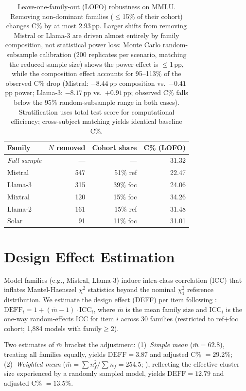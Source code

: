 \begin{table}[h]
\centering
\caption{Leave-one-family-out (LOFO) robustness on MMLU. Removing non-dominant families ($\leq$15\% of their cohort) changes C\% by at most 2.93\,pp. Larger shifts from removing Mistral or Llama-3 are driven almost entirely by family composition, not statistical power loss: Monte Carlo random-subsample calibration (200 replicates per scenario, matching the reduced sample size) shows the power effect is $\leq$1\,pp, while the composition effect accounts for 95--113\% of the observed C\% drop (Mistral: $-8.44$\,pp composition vs.\ $-0.41$\,pp power; Llama-3: $-8.17$\,pp vs.\ ${+}0.91$\,pp; observed C\% falls below the 95\% random-subsample range in both cases). Stratification uses total test score for computational efficiency; cross-subject matching yields identical baseline C\%.}
\label{tab:lofo}
\small
\begin{tabular}{lrrr}
\toprule
Family & $N$ removed & Cohort share & C\% (LOFO) \\
\midrule
\emph{Full sample} & --- & --- & 31.32 \\
Mistral & 547 & 51\% ref & 22.47 \\
Llama-3 & 315 & 39\% foc & 24.06 \\
Mixtral & 120 & 15\% foc & 34.26 \\
Llama-2 & 161 & 15\% ref & 31.48 \\
Solar & 91 & 11\% foc & 31.01 \\
\bottomrule
\end{tabular}
\end{table}

\section{Design Effect Estimation}
\label{app:deff}

Model families (e.g., Mistral, Llama-3) induce intra-class correlation (ICC) that inflates Mantel-Haenszel $\chi^2$ statistics beyond the nominal $\chi^2_1$ reference distribution. We estimate the design effect (DEFF) per item following \citet{rao1992variance}: $\mathrm{DEFF}_i = 1 + (\bar{m} - 1) \cdot \mathrm{ICC}_i$, where $\bar{m}$ is the mean family size and $\mathrm{ICC}_i$ is the one-way random-effects ICC for item $i$ across 30 families (restricted to ref+foc cohort; 1,884 models with family$\geq$2).

Two estimates of $\bar{m}$ bracket the adjustment: (1)~\emph{Simple mean} ($\bar{m} = 62.8$), treating all families equally, yields $\mathrm{DEFF} = 3.87$ and adjusted C\% $= 29.2\%$; (2)~\emph{Weighted mean} ($\bar{m} = \sum n_f^2 / \sum n_f = 254.5$; \citealp{kish1965survey}), reflecting the effective cluster size experienced by a randomly sampled model, yields $\mathrm{DEFF} = 12.79$ and adjusted C\% $= 13.5\%$.

